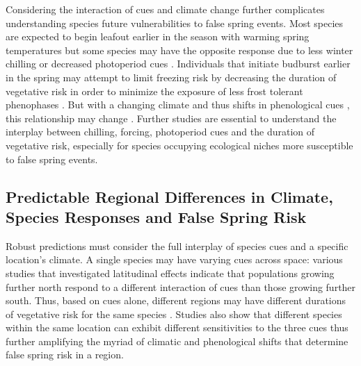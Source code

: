 \documentclass{article}\usepackage[]{graphicx}\usepackage[]{color}
\begin{document}
Considering the interaction of cues and climate change further complicates understanding species future vulnerabilities to false spring events. Most species are expected to begin leafout earlier in the season with warming spring temperatures but some species may have the opposite response due to less winter chilling or decreased photoperiod cues \citep{Cleland2006, Fu2015, Xin2016}. %
Individuals that initiate budburst earlier in the spring may attempt to limit freezing risk by decreasing the duration of vegetative risk in order to minimize the exposure of less frost tolerant phenophases \citep{Augspurger2009}. But with a changing climate and thus shifts in phenological cues%
, this relationship may change \citep{Dolezal2016}. Further studies are essential to understand the interplay between chilling, forcing, photoperiod cues and the duration of vegetative risk, especially for species occupying ecological niches more susceptible to false spring events. 

\subsection* {Predictable Regional Differences in Climate, Species Responses and False Spring Risk}
Robust predictions must consider the full interplay of species cues and a specific location's climate. A single species may have varying cues across space: various studies that investigated latitudinal effects indicate that populations growing further north respond to a different interaction of cues than those growing further south. Thus, based on cues alone, different regions may have different durations of vegetative risk for the same species \citep {Partanen2004, Viheraaarnio2006, Caffarra2011}. Studies also show that different species within the same location can exhibit different sensitivities to the three cues \citep{Basler2012, Laube2013} thus further amplifying the myriad of climatic and phenological shifts that determine false spring risk in a region.  
\end{document}
